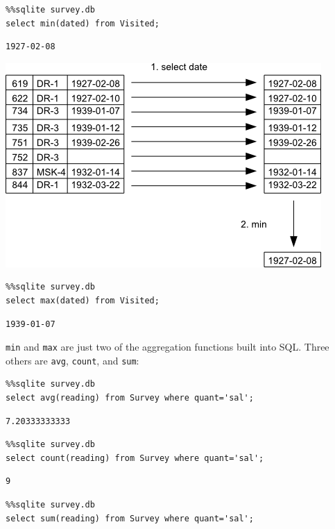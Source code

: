 \documentclass[]{book}
\begin{document}
\begin{verbatim}
%%sqlite survey.db
select min(dated) from Visited;
\end{verbatim}

\begin{verbatim}
1927-02-08
\end{verbatim}

\includegraphics{novice/sql/img/sql-aggregation.png}

\begin{verbatim}
%%sqlite survey.db
select max(dated) from Visited;
\end{verbatim}

\begin{verbatim}
1939-01-07
\end{verbatim}

\texttt{min} and \texttt{max} are just two of the aggregation functions
built into SQL. Three others are \texttt{avg}, \texttt{count}, and
\texttt{sum}:

\begin{verbatim}
%%sqlite survey.db
select avg(reading) from Survey where quant='sal';
\end{verbatim}

\begin{verbatim}
7.20333333333
\end{verbatim}

\begin{verbatim}
%%sqlite survey.db
select count(reading) from Survey where quant='sal';
\end{verbatim}

\begin{verbatim}
9
\end{verbatim}

\begin{verbatim}
%%sqlite survey.db
select sum(reading) from Survey where quant='sal';
\end{verbatim}
\end{document}
